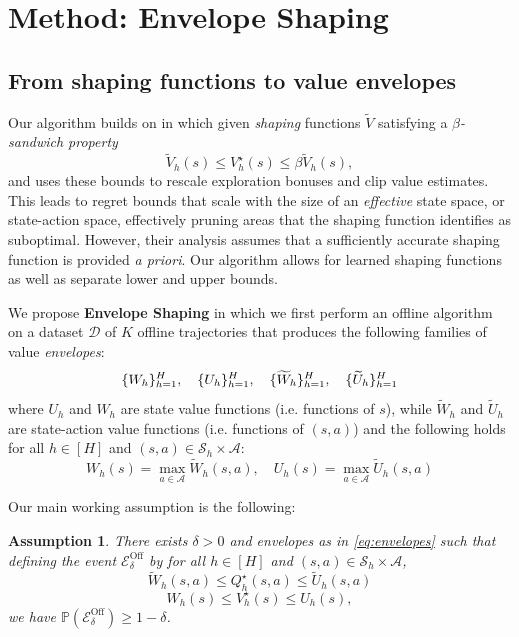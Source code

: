 \documentclass[twoside]{article}
\newtheorem{assumption}{Assumption}
\DeclarePairedDelimiter{\crl}{\{}{\}}
\newcommand{\lowq}{\widetilde{W}} %
\newcommand{\highq}{\widetilde{U}} %
\newcommand{\lowv}{W} %
\newcommand{\highv}{U} %
\newcounter{notecounter}
\newcommand{\note}[2]{\refstepcounter{notecounter} \begin{leftbar}  \textcolor{red}{\textbf{#1}} \textcolor{violet}{(\textbf{Note} \thenotecounter)}: \begin{sf}{\color{blue} #2} \end{sf}  \end{leftbar}}
\newcommand{\note}[2]{}
\begin{document}
\section{Method: Envelope Shaping}\label{sec:method}

\subsection{From shaping functions to value envelopes}

Our algorithm builds on \cite{gupta_unpacking_2022} in which given \emph{shaping} functions $\widetilde{V}$ satisfying a \emph{$\beta$-sandwich property}
\[\widetilde{V}_h(s) \leq V_h^{\star}(s) \leq \beta \widetilde{V}_h(s),\]
and uses these bounds to rescale exploration bonuses and clip value estimates. This leads to regret bounds that scale with the size of an \emph{effective} state space, or state-action space, effectively pruning areas that the shaping function identifies as suboptimal. However, their analysis assumes that a sufficiently accurate shaping function is provided \emph{a priori}. Our algorithm allows for learned shaping functions as well as separate lower and upper bounds.

We propose \textbf{Envelope Shaping} in which we first perform an offline algorithm on a dataset $\mathcal{D}$ of $K$ offline trajectories that produces the following families of value \emph{envelopes}:
\begin{equation}
  \label{eq:envelopes}
  \crl{\lowv_{h}}_{h=1}^{H}, \quad \crl{\highv_{h}}_{h=1}^{H}, \quad \crl{\lowq_h}_{h=1}^{H}, \quad \crl{\highq_h}_{h=1}^{H}
\end{equation}
where $\highv_{h}$ and $\lowv_{h}$ are state value functions (i.e. functions of $s$), while $\lowq_h$ and $\highq_h$ are state-action value functions (i.e. functions of $(s,a)$) and the following holds for all $h \in [H]$ and $(s,a) \in \mathcal{S}_h \times \mathcal{A}$:
\[
\lowv_{h}(s) {=} \max_{a \in \mathcal{A}} \lowq_h(s,a), \quad \highv_{h}(s) {=} \max_{a \in \mathcal{A}} \highq_h(s,a)
\]

Our main working assumption is the following:

\begin{assumption} \label{assumption:sandwich} There exists $\delta>0$ and envelopes as in \eqref{eq:envelopes} such that defining the event $\mathcal{E}^{\mathrm{Off}}_\delta$ by  for all $h \in [H]$ and $(s,a) \in \mathcal{S}_h \times \mathcal{A}$, 
  \begin{equation}
  \label{eq:v_sandwich}
 \lowq_h(s,a) \leq Q_h^\star(s,a) \leq \highq_h(s,a)
\end{equation}
\begin{equation}
  \label{eq:q_sandwich}
 \lowv_{h}(s) \leq V_h^\star(s) \leq \highv_{h}(s), 
\end{equation}
we have $\mathbb{P}(\mathcal{E}^{\mathrm{Off}}_\delta) \geq 1-\delta$.
\end{assumption}
\end{document}
